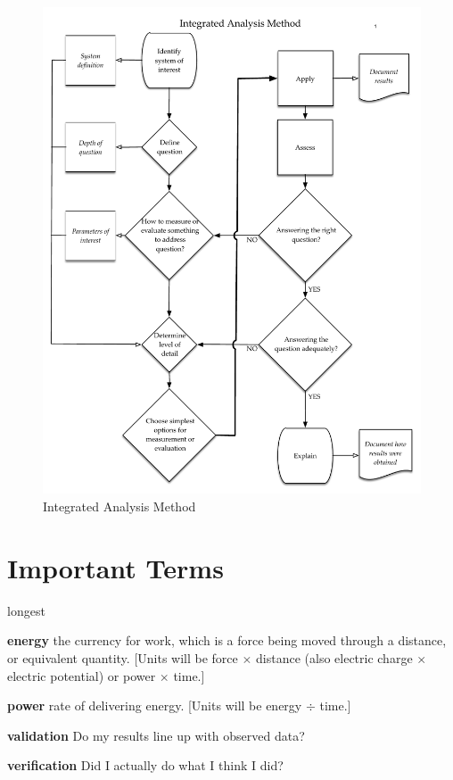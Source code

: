 \documentclass[10pt]{article}
\begin{document}
\medskip
            \begin{figure}[h]
            \centering
            \includegraphics[width=6in]{extras00/Integrated Analysis Method overview and implementation.pdf}
            \caption{Integrated Analysis Method}
            \label{IAM}
            \end{figure}
\bigskip

\section{Important Terms}

\begin{labeling}{longest}
\item [\textbf{energy}] the currency for work, which is a force being moved through a distance, or equivalent quantity. [Units will be force $\times$ distance (also electric charge $\times$ electric potential) or power $\times$ time.]
\item [\textbf{power}] rate of delivering energy. [Units will be energy $\div$ time.]\\
\item [\textbf{validation}] Do my results line up with observed data?
\item [\textbf{verification}] Did I actually do what I think I did?
\end{labeling}
\end{document}

